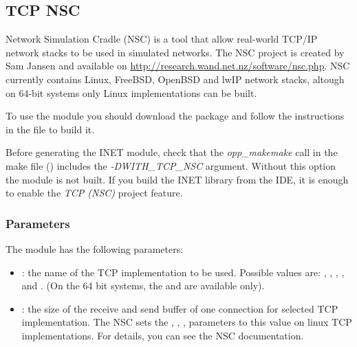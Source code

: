 \subsection{TCP NSC}

Network Simulation Cradle (NSC) is a tool that allow real-world TCP/IP network stacks
to be used in simulated networks. The NSC project is created by Sam Jansen
and available on \url{http://research.wand.net.nz/software/nsc.php}. NSC currently
contains Linux, FreeBSD, OpenBSD and lwIP network stacks, altough on 64-bit
systems only Linux implementations can be built.

To use the  module you should download the
 package and follow the instructions
in the  file to build it.

\begin{warning}
Before generating the INET module, check that the \emph{opp\_makemake} call
in the make file () includes the
\emph{-DWITH\_TCP\_NSC} argument. Without this option the 
module is not built. If you build the INET library from the IDE, it is enough
to enable the \emph{TCP (NSC)} project feature.
\end{warning}

\subsubsection*{Parameters}

The  module has the following parameters:

\begin{itemize}
  \item {}: the name of the TCP implementation to be used.
  Possible values are: , ,
  , ,  and
  . (On the 64 bit systems, the  and
   are available only).

  \item {}: the size of the receive and send buffer of
  one connection for selected TCP implementation.
  The NSC sets the , , , 
  parameters to this value on linux TCP implementations. For details, you can see
  the NSC documentation.
\end{itemize}


